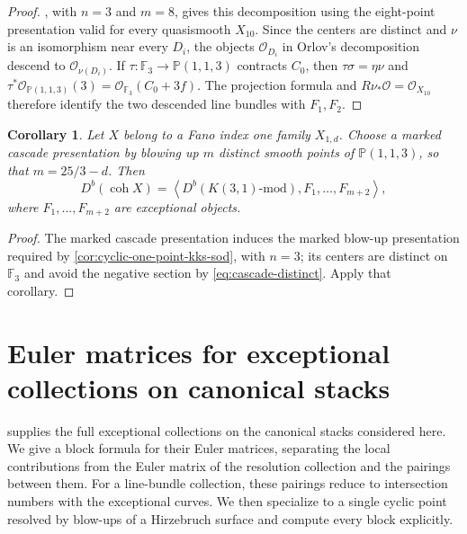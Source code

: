 \documentclass[11pt]{article}
\theoremstyle{plain}
\newtheorem{corollary}[corollary]{Corollary}
\theoremstyle{definition}
\theoremstyle{remark}
\newcommand{\Pp}{\mathbb P}
\newcommand{\F}{\mathbb F}
\newcommand{\Db}{D^b}
\newcommand{\coh}{\operatorname{coh}}
\newcommand{\OO}{\mathcal O}
\begin{document}
\begin{proof}
, with \(n=3\) and \(m=8\), gives
this decomposition using the eight-point presentation valid for every
quasismooth \(X_{10}\). Since the centers are distinct
and \(\nu\) is an isomorphism near every \(D_i\), the objects
\(\OO_{D_i}\) in Orlov's decomposition descend to \(\OO_{\nu(D_i)}\). If
\(\tau:\F_3\to\Pp(1,1,3)\) contracts \(C_0\), then
\(\tau\sigma=\eta\nu\) and
\(\tau^*\OO_{\Pp(1,1,3)}(3)=\OO_{\F_3}(C_0+3f)\).
The projection formula and \(R\nu_*\OO=\OO_{X_{10}}\) therefore
identify the two descended line bundles with \(F_1,F_2\).
\end{proof}


\begin{corollary}\label{cor:one-point-kks-sod}
Let \(X\) belong to a Fano index one family \(X_{1,d}\). Choose a marked cascade
presentation by blowing up \(m\) distinct smooth points of \(\Pp(1,1,3)\), so that
\(m=25/3-d\). Then
\[
\Db(\coh X)
=
\left\langle
\Db(K(3,1)\text{-mod}),F_1,\dots,F_{m+2}
\right\rangle,
\]
where \(F_1,\dots,F_{m+2}\) are exceptional objects.
\end{corollary}

\begin{proof}
The marked cascade presentation induces the marked blow-up presentation required
by \cref{cor:cyclic-one-point-kks-sod}, with \(n=3\); its centers
are distinct on \(\F_3\) and avoid the negative section by
\eqref{eq:cascade-distinct}. Apply that corollary.
\end{proof}

\section{Euler matrices for exceptional collections on canonical stacks}
\label{sec:further-directions}

 supplies the full exceptional collections
on the canonical stacks considered here. We give a block formula for their
Euler matrices, separating the local contributions from the Euler matrix
of the resolution collection and the pairings between them. For a
line-bundle collection, these pairings reduce to intersection numbers with
the exceptional curves. We then specialize to a single cyclic point
resolved by blow-ups of a Hirzebruch surface and compute every block
explicitly.
\end{document}
